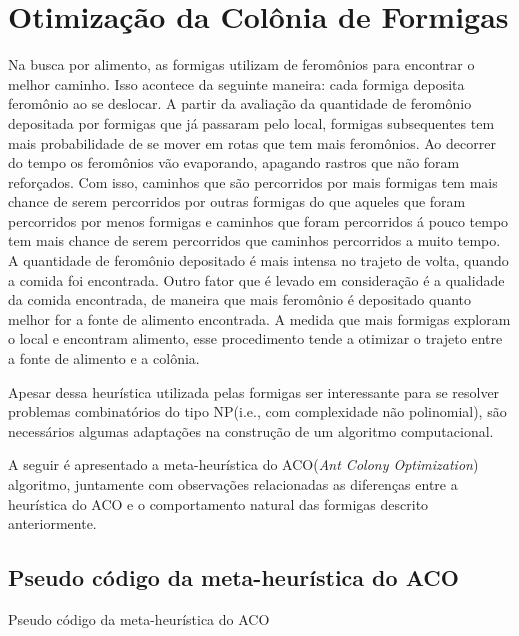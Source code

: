 \section{Otimização da Colônia de Formigas}

Na busca por alimento, as formigas utilizam de feromônios para encontrar o melhor caminho.
Isso acontece da seguinte maneira: cada formiga deposita feromônio ao se deslocar. A partir
da avaliação da quantidade de feromônio depositada por formigas que já passaram pelo local,
formigas subsequentes tem mais probabilidade de se mover em rotas que tem mais feromônios. Ao
decorrer do tempo os feromônios vão evaporando, apagando rastros que não foram reforçados. 
Com isso, caminhos que são percorridos por mais formigas tem mais chance de serem 
percorridos por outras formigas do que aqueles que foram percorridos por menos formigas e 
caminhos que foram percorridos á pouco tempo tem mais chance de serem percorridos que caminhos
percorridos a muito tempo. A quantidade de feromônio depositado é mais intensa no trajeto de volta,
quando a comida foi encontrada. Outro fator que é levado em consideração é a qualidade da comida
encontrada, de maneira que mais feromônio é depositado quanto melhor for a fonte de alimento encontrada.
A medida que mais formigas exploram o local e encontram alimento, esse procedimento tende a otimizar o
trajeto entre a fonte de alimento e a colônia.

Apesar dessa heurística utilizada pelas formigas ser interessante para se resolver problemas combinatórios 
do tipo NP(i.e., com complexidade não polinomial), são necessários algumas adaptações na construção
de um algoritmo computacional.

A seguir é apresentado a meta-heurística do ACO(\textit{Ant Colony Optimization}) algoritmo, juntamente com observações relacionadas as diferenças
entre a heurística do ACO e o comportamento natural das formigas descrito anteriormente.

\subsection{Pseudo código da meta-heurística do ACO}
\begin{algorithm}[H]
\label{meta-heuristica_aco}



\caption{Pseudo código da meta-heurística do ACO}
\end{algorithm}

